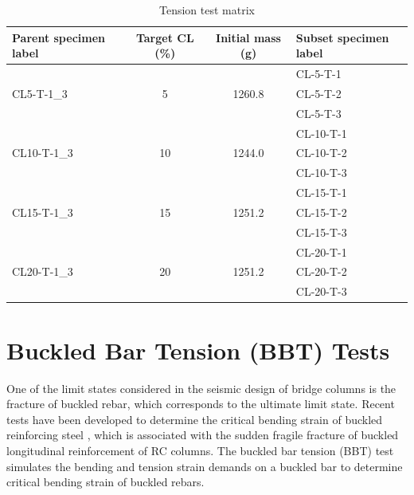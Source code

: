 \begin{table}[htbp]
\caption{Tension test matrix}
\label{tab:tension_matrix}
\centering
\begin{tabular}{lccl}
Parent specimen label        & Target CL (\%)      & Initial mass (g)        & Subset specimen label \\ \hline
\multirow{3}{*}{CL5-T-1\_3}  & \multirow{3}{*}{5}  & \multirow{3}{*}{1260.8} & CL-5-T-1              \\
                             &                     &                         & CL-5-T-2              \\
                             &                     &                         & CL-5-T-3              \\
\multirow{3}{*}{CL10-T-1\_3} & \multirow{3}{*}{10} & \multirow{3}{*}{1244.0} & CL-10-T-1             \\
                             &                     &                         & CL-10-T-2             \\
                             &                     &                         & CL-10-T-3             \\
\multirow{3}{*}{CL15-T-1\_3\*} & \multirow{3}{*}{15} & \multirow{3}{*}{1251.2} & CL-15-T-1             \\
                             &                     &                         & CL-15-T-2             \\
                             &                     &                         & CL-15-T-3             \\
\multirow{3}{*}{CL20-T-1\_3} & \multirow{3}{*}{20} & \multirow{3}{*}{1251.2} & CL-20-T-1             \\
                             &                     &                         & CL-20-T-2             \\
                             &                     &                         & CL-20-T-3            
\end{tabular}
\end{table}

\section{Buckled Bar Tension (BBT) Tests}

One of the limit states considered in the seismic design of bridge columns is the fracture of buckled rebar, which corresponds to the ultimate limit state. Recent tests have been developed to determine the critical bending strain of buckled reinforcing steel \cite{Barcley2019}, which is associated with the sudden fragile fracture of buckled longitudinal reinforcement of RC columns. The buckled bar tension (BBT) test simulates the bending and tension strain demands on a buckled bar to determine critical bending strain of buckled rebars. 

